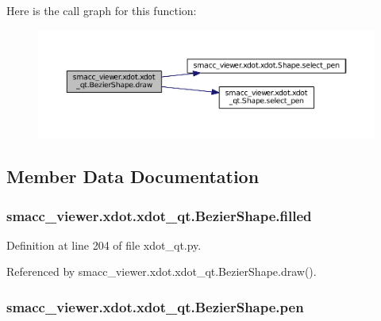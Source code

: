 Here is the call graph for this function\+:
\nopagebreak
\begin{figure}[H]
\begin{center}
\leavevmode
\includegraphics[width=350pt]{classsmacc__viewer_1_1xdot_1_1xdot__qt_1_1BezierShape_a19dbc35eb56d0a2fec2a74295d9a0c93_cgraph}
\end{center}
\end{figure}




\subsection{Member Data Documentation}
\subsubsection[{\texorpdfstring{filled}{filled}}]{\setlength{\rightskip}{0pt plus 5cm}smacc\+\_\+viewer.\+xdot.\+xdot\+\_\+qt.\+Bezier\+Shape.\+filled}\hypertarget{classsmacc__viewer_1_1xdot_1_1xdot__qt_1_1BezierShape_a57fa45fe41f604d87ceabde0bb904b91}{}\label{classsmacc__viewer_1_1xdot_1_1xdot__qt_1_1BezierShape_a57fa45fe41f604d87ceabde0bb904b91}


Definition at line 204 of file xdot\+\_\+qt.\+py.



Referenced by smacc\+\_\+viewer.\+xdot.\+xdot\+\_\+qt.\+Bezier\+Shape.\+draw().

\subsubsection[{\texorpdfstring{pen}{pen}}]{\setlength{\rightskip}{0pt plus 5cm}smacc\+\_\+viewer.\+xdot.\+xdot\+\_\+qt.\+Bezier\+Shape.\+pen}\hypertarget{classsmacc__viewer_1_1xdot_1_1xdot__qt_1_1BezierShape_ab13d4ab5182465581ca140221340a8dc}{}\label{classsmacc__viewer_1_1xdot_1_1xdot__qt_1_1BezierShape_ab13d4ab5182465581ca140221340a8dc}


